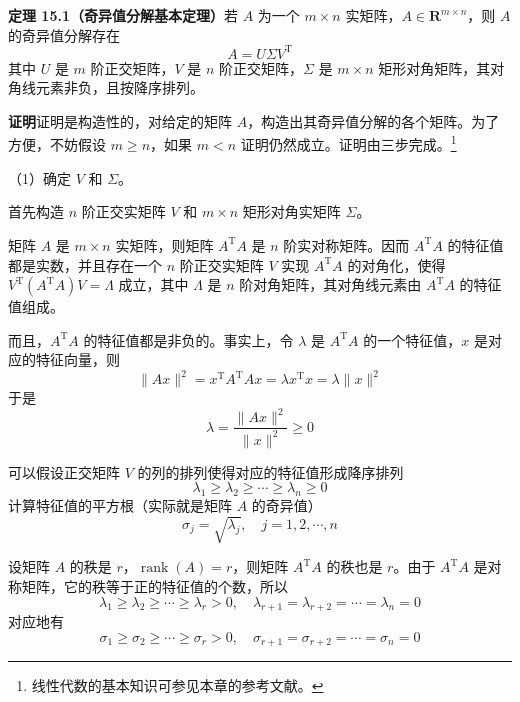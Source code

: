 \documentclass[UTF8,12pt,a4paper,fontset=fandol]{ctexart}
\begin{document}
\noindent\textbf{定理 15.1（奇异值分解基本定理）}\quad 若 $A$ 为一个 $m\times n$ 实矩阵，$A\in\mathbf{R}^{m\times n}$，则 $A$ 的奇异值分解存在
\begin{equation}
A=U\Sigma V^{\mathrm{T}}
\tag{15.2}
\end{equation}
其中 $U$ 是 $m$ 阶正交矩阵，$V$ 是 $n$ 阶正交矩阵，$\Sigma$ 是 $m\times n$ 矩形对角矩阵，其对角线元素非负，且按降序排列。

\noindent\textbf{证明}\quad 证明是构造性的，对给定的矩阵 $A$，构造出其奇异值分解的各个矩阵。为了方便，不妨假设 $m\geqslant n$，如果 $m<n$ 证明仍然成立。证明由三步完成。\footnote{线性代数的基本知识可参见本章的参考文献。}

（1）确定 $V$ 和 $\Sigma$。

首先构造 $n$ 阶正交实矩阵 $V$ 和 $m\times n$ 矩形对角实矩阵 $\Sigma$。

矩阵 $A$ 是 $m\times n$ 实矩阵，则矩阵 $A^{\mathrm{T}}A$ 是 $n$ 阶实对称矩阵。因而 $A^{\mathrm{T}}A$ 的特征值都是实数，并且存在一个 $n$ 阶正交实矩阵 $V$ 实现 $A^{\mathrm{T}}A$ 的对角化，使得 $V^{\mathrm{T}}(A^{\mathrm{T}}A)V=\Lambda$ 成立，其中 $\Lambda$ 是 $n$ 阶对角矩阵，其对角线元素由 $A^{\mathrm{T}}A$ 的特征值组成。

而且，$A^{\mathrm{T}}A$ 的特征值都是非负的。事实上，令 $\lambda$ 是 $A^{\mathrm{T}}A$ 的一个特征值，$x$ 是对应的特征向量，则
\[
\|Ax\|^2=x^{\mathrm{T}}A^{\mathrm{T}}Ax=\lambda x^{\mathrm{T}}x=\lambda\|x\|^2
\]
于是
\begin{equation}
\lambda=\frac{\|Ax\|^2}{\|x\|^2}\geqslant0
\tag{15.3}
\end{equation}

可以假设正交矩阵 $V$ 的列的排列使得对应的特征值形成降序排列
\[
\lambda_1\geqslant\lambda_2\geqslant\cdots\geqslant\lambda_n\geqslant0
\]
计算特征值的平方根（实际就是矩阵 $A$ 的奇异值）
\[
\sigma_j=\sqrt{\lambda_j},\quad j=1,2,\cdots,n
\]

设矩阵 $A$ 的秩是 $r$，$\operatorname{rank}(A)=r$，则矩阵 $A^{\mathrm{T}}A$ 的秩也是 $r$。由于 $A^{\mathrm{T}}A$ 是对称矩阵，它的秩等于正的特征值的个数，所以
\begin{equation}
\lambda_1\geqslant\lambda_2\geqslant\cdots\geqslant\lambda_r>0,\quad
\lambda_{r+1}=\lambda_{r+2}=\cdots=\lambda_n=0
\tag{15.4}
\end{equation}
对应地有
\begin{equation}
\sigma_1\geqslant\sigma_2\geqslant\cdots\geqslant\sigma_r>0,\quad
\sigma_{r+1}=\sigma_{r+2}=\cdots=\sigma_n=0
\tag{15.5}
\end{equation}
\end{document}
